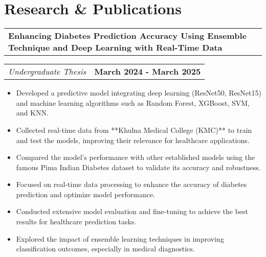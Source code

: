 \section{\textbf{Research \& Publications}}
\vspace{-0.4mm}

\begin{tabularx}{\textwidth}{X r} 
    \textbf{Enhancing Diabetes Prediction Accuracy Using Ensemble Technique and Deep Learning with Real-Time Data} & \\
\end{tabularx}
\begin{tabularx}{\textwidth}{X r} 
    \textit{Undergraduate Thesis} & \textbf{March 2024 - March 2025} \\
\end{tabularx}

\begin{itemize}
    \item Developed a predictive model integrating deep learning (ResNet50, ResNet15) and machine learning algorithms such as Random Forest, XGBoost, SVM, and KNN.
    \item Collected real-time data from **Khulna Medical College (KMC)** to train and test the models, improving their relevance for healthcare applications.
    \item Compared the model's performance with other established models using the famous Pima Indian Diabetes dataset to validate its accuracy and robustness.
    \item Focused on real-time data processing to enhance the accuracy of diabetes prediction and optimize model performance.
    \item Conducted extensive model evaluation and fine-tuning to achieve the best results for healthcare prediction tasks.
    \item Explored the impact of ensemble learning techniques in improving classification outcomes, especially in medical diagnostics.
\end{itemize}
